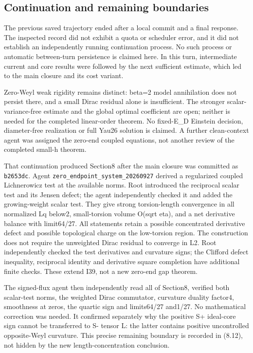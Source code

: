 \documentclass[
  10pt,
]{article}
\begin{document}
\hypertarget{continuation-and-remaining-boundaries}{%
\subsection{Continuation and remaining
boundaries}\label{continuation-and-remaining-boundaries}}

The previous saved trajectory ended after a local commit and a final
response. The inspected record did not exhibit a quota or scheduler
error, and it did not establish an independently running continuation
process. No such process or automatic between-turn persistence is
claimed here. In this turn, intermediate current and core results were
followed by the next sufficient estimate, which led to the main closure
and its cost variant.

Zero-Weyl weak rigidity remains distinct: beta=2 model annihilation does
not persist there, and a small Dirac residual alone is insufficient. The
stronger scalar-variance-free estimate and the global optimal
coefficient are open; neither is needed for the completed linear-order
theorem. No fixed-E\_D Einstein decision, diameter-free realization or
full Yau26 solution is claimed. A further clean-context agent was
assigned the zero-end coupled equations, not another review of the
completed small-h theorem.

That continuation produced Section8 after the main closure was committed
as \texttt{b2653dc}. Agent \texttt{zero\_endpoint\_system\_20260927}
derived a regularized coupled Lichnerowicz test at the available norms.
Root introduced the reciprocal scalar test and its Jensen defect; the
agent independently checked it and added the growing-weight scalar test.
They give strong torsion-length convergence in all normalized Lq below2,
small-torsion volume O(sqrt eta), and a net derivative balance with
limit64/27. All statements retain a possible concentrated derivative
defect and possible topological charge on the low-torsion region. The
construction does not require the unweighted Dirac residual to converge
in L2. Root independently checked the test derivatives and curvature
signs; the Clifford defect inequality, reciprocal identity and
derivative square completion have additional finite checks. These extend
I39, not a new zero-end gap theorem.

The signed-flux agent then independently read all of Section8, verified
both scalar-test norms, the weighted Dirac commutator, curvature duality
factor4, smoothness at zeros, the quartic sign and limits64/27 and1/27.
No mathematical correction was needed. It confirmed separately why the
positive S+ ideal-core sign cannot be transferred to S- tensor L: the
latter contains positive uncontrolled opposite-Weyl curvature. This
precise remaining boundary is recorded in (8.12), not hidden by the new
length-concentration conclusion.
\end{document}
